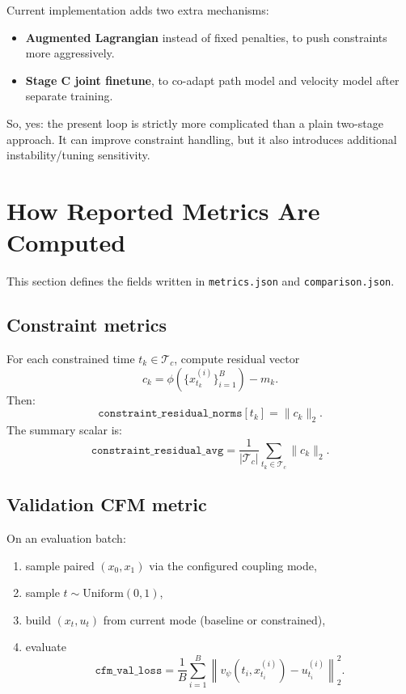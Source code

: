 \documentclass[11pt]{article}
\begin{document}
Current implementation adds two extra mechanisms:
\begin{itemize}
    \item \textbf{Augmented Lagrangian} instead of fixed penalties, to push constraints more aggressively.
    \item \textbf{Stage C joint finetune}, to co-adapt path model and velocity model after separate training.
\end{itemize}

So, yes: the present loop is strictly more complicated than a plain two-stage approach.
It can improve constraint handling, but it also introduces additional instability/tuning sensitivity.

\section{How Reported Metrics Are Computed}
This section defines the fields written in \texttt{metrics.json} and \texttt{comparison.json}.

\subsection*{Constraint metrics}
For each constrained time $t_k \in \mathcal{T}_c$, compute residual vector
\[
c_k = \phi\!\left(\{x_{t_k}^{(i)}\}_{i=1}^B\right)-m_k.
\]
Then:
\[
\texttt{constraint\_residual\_norms}[t_k] = \|c_k\|_2.
\]
The summary scalar is:
\[
\texttt{constraint\_residual\_avg}
=
\frac{1}{|\mathcal{T}_c|}
\sum_{t_k\in\mathcal{T}_c}\|c_k\|_2.
\]

\subsection*{Validation CFM metric}
On an evaluation batch:
\begin{enumerate}
    \item sample paired $(x_0,x_1)$ via the configured coupling mode,
    \item sample $t \sim \mathrm{Uniform}(0,1)$,
    \item build $(x_t,u_t)$ from current mode (baseline or constrained),
    \item evaluate
    \[
    \texttt{cfm\_val\_loss}
    =
    \frac{1}{B}\sum_{i=1}^B
    \left\|
    v_\psi(t_i,x_{t_i}^{(i)})-u_{t_i}^{(i)}
    \right\|_2^2.
    \]
\end{enumerate}
\end{document}
